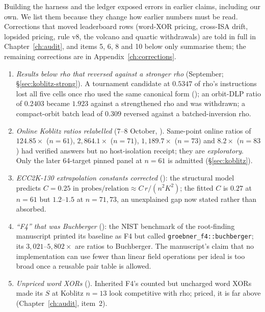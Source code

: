 Building the harness and the ledger exposed errors in earlier claims,
including our own. We list them because they change how earlier numbers
must be read. Corrections that moved leaderboard rows (word-XOR pricing,
cross-ISA drift, lopsided pricing, rule v8, the volcano and quartic
withdrawals) are told in full in Chapter~\ref{ch:audit}, and items 5, 6, 8
and 10 below only summarise them; the remaining corrections are in
Appendix~\ref{ch:corrections}.
\begin{enumerate}
\item \emph{Results below rho that reversed against a stronger rho}
  (September; \S\ref{sec:koblitz-strong}). A tournament candidate at
  $0.5347$ of rho's instructions lost all five cells once rho used the same
  canonical form (); an orbit-DLP
  ratio of $0.2403$ became $1.923$ against a strengthened rho and was
  withdrawn; a compact-orbit batch lead of $0.309$ reversed against a
  batched-inversion rho.
\item \emph{Online Koblitz ratios relabelled} (7--8 October,
  ). Same-point online
  ratios of $124.85\times$ ($n=61$), $2{,}864.1\times$ ($n=71$),
  $1{,}189.7\times$ ($n=73$) and $8.2\times$ ($n=83$) had verified answers
  but no host-isolation receipt; they are \emph{exploratory}. Only the
  later 64-target pinned panel at $n=61$ is admitted (\S\ref{sec:koblitz}).
\item \emph{ECC2K-130 extrapolation constants corrected}
  (): the structural model
  predicts $C=0.25$ in $\text{probes/relation}\approx C\,r/(n^2K^2)$; the
  fitted $C$ is $0.27$ at $n=61$ but $1.2$--$1.5$ at $n=71,73$, an
  unexplained gap now stated rather than absorbed.
\item \emph{``F4'' that was Buchberger}
  (): the
  NIST benchmark of the root-finding manuscript printed its baseline as F4
  but called \texttt{groebner\_f4::buchberger}; its $3{,}021$--$5{,}802\times$
  are ratios to Buchberger. The manuscript's claim that no implementation
  can use fewer than linear field operations per ideal is too broad once a
  reusable pair table is allowed.
\item \emph{Unpriced word XORs} ().
  Inherited F4's counted but uncharged word XORs made its $S$ at Koblitz
  $n=13$ look competitive with rho; priced, it is far above
  (Chapter~\ref{ch:audit}, item~2).

\end{enumerate}
